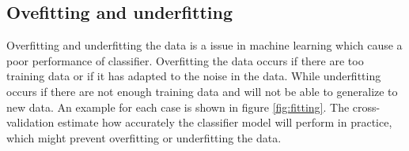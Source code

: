 \documentclass[USenglish]{ifimaster}  %
\begin{document}
\subsection{Ovefitting and underfitting}
Overfitting and underfitting the data is a issue in machine learning which cause a poor performance of classifier. Overfitting the data occurs if there are too training data or if it has adapted to the noise in the data. While underfitting occurs if there are not enough training data and will not be able to generalize to new data. An example for each case is shown in figure \ref{fig:fitting}. The cross-validation estimate how accurately the classifier model will perform in practice, which might prevent overfitting or underfitting the data.

\end{document}
